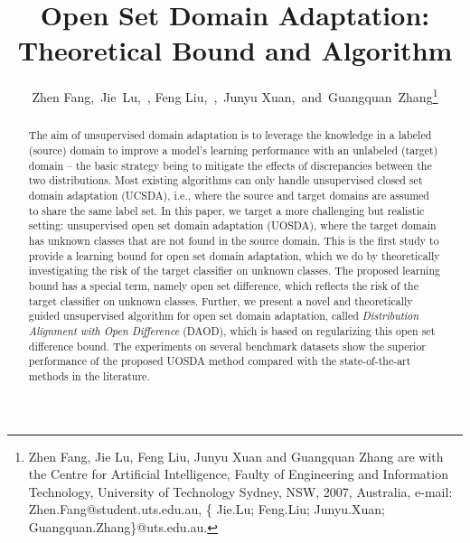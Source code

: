 \documentclass[journal]{IEEEtran}
\begin{document}
\title{Open Set Domain Adaptation: \\Theoretical Bound and Algorithm}
\author{Zhen Fang,~Jie~Lu,~, Feng Liu,~,~Junyu Xuan,~and~Guangquan~Zhang\thanks{Zhen Fang, Jie Lu, Feng Liu, Junyu Xuan and Guangquan Zhang are with the Centre for Artificial Intelligence, Faulty of Engineering and Information Technology, University of Technology Sydney,
NSW, 2007, Australia, e-mail: Zhen.Fang@student.uts.edu.au, \{ Jie.Lu; Feng.Liu; Junyu.Xuan; Guangquan.Zhang\}@uts.edu.au. }}




















\maketitle

\begin{abstract}
 The aim of unsupervised domain adaptation is to leverage the knowledge in a labeled (source) domain to improve  a model's learning performance with an unlabeled (target) domain -- the basic strategy being to mitigate the effects of discrepancies between the two distributions. Most existing algorithms can only handle unsupervised closed set domain adaptation (UCSDA), i.e., where the source and target domains are assumed to share the same label set. In this paper, we target a more challenging but realistic setting: unsupervised open set domain adaptation (UOSDA), where the target domain has unknown classes that are not found in the source domain. This is the first study to provide a learning bound for open set domain adaptation, which we do by theoretically investigating the risk of the target classifier on unknown classes. The proposed
learning bound has a
special term, namely open set difference, which reflects the risk
of the target classifier on unknown classes. Further, we present a novel and theoretically guided unsupervised algorithm for open set domain adaptation, called \textit{Distribution Alignment with Open Difference} (DAOD), which is based on regularizing this open set difference bound. The experiments on several benchmark datasets show the superior performance of the proposed UOSDA method compared with the state-of-the-art methods in the literature.
\end{abstract}
\end{document}
